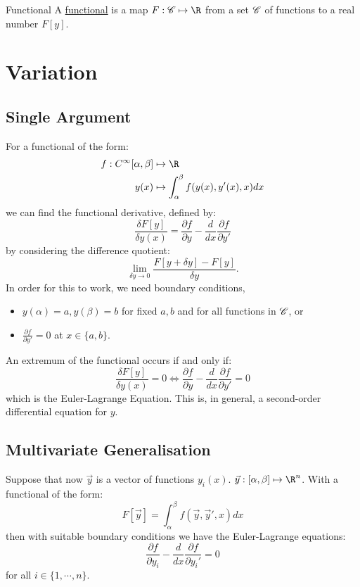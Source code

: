\documentclass[../Main.tex]{subfiles}
\begin{document}
\begin{definition}{Functional}
    A \underline{functional} is a map $F : \funcset \mapsto \R$ from a set $\mathscr{C}$ of functions to a real number $F[y]$.
\end{definition}
\section{Variation}
\subsection{Single Argument}
For a functional of the form:
\begin{align*}
    f : C^\infty[\alpha, \beta] &\mapsto \R\\
    y(x) &\mapsto\int_{\alpha}^{\beta} f(y(x), y'(x), x) dx 
\end{align*}
we can find the functional derivative, defined by:
\begin{equation*}
    \frac{\delta F[y]}{\delta y(x)} = \frac{\partial f}{\partial y} - \frac{d}{dx} \frac{\partial f}{\partial y'}
\end{equation*}
by considering the difference quotient:
\begin{equation*}
    \lim_{\delta y \to 0} \frac{F[y + \delta y]- F[y]}{\delta y}.
\end{equation*}
In order for this to work, we need boundary conditions,
\begin{itemize}
    \item $y(\alpha) = a, y(\beta) = b$ for fixed $a, b$ and for all functions in $\mathscr{C}$, or
    \item $\frac{\partial f}{\partial y'} = 0$ at $x \in \{a, b\}$.
\end{itemize}
An extremum of the functional occurs if and only if:
\begin{equation*}
    \frac{\delta F[y]}{\delta y(x)} = 0 \iff \frac{\partial f}{\partial y} - \frac{d}{dx} \frac{\partial f}{\partial y'} = 0
\end{equation*}
which is the Euler-Lagrange Equation. This is, in general, a second-order differential equation for $y$.
\subsection{Multivariate Generalisation}
Suppose that now $\vec{y}$ is a vector of functions $y_i(x)$. $\vec{y} : [\alpha, \beta] \mapsto \R^n$. With a functional of the form:
\begin{equation*}
    F[\vec{y}] = \int_{\alpha}^{\beta} f(\vec{y}, \vec{y}', x) dx
\end{equation*}
then with suitable boundary conditions we have the Euler-Lagrange equations:
\begin{equation*}
    \frac{\partial f}{\partial y_i} - \frac{d}{dx} \frac{\partial f}{\partial y_i'} = 0
\end{equation*}
for all $i \in \{1, \cdots, n\}$.
\end{document}
